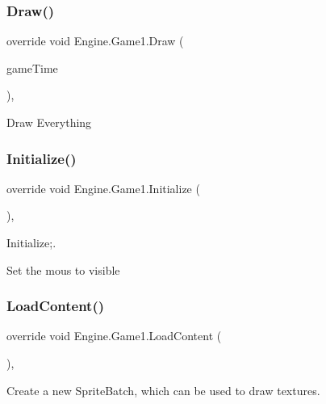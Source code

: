 \subsubsection{\texorpdfstring{Draw()}{Draw()}}
{\footnotesize\ttfamily override void Engine.\+Game1.\+Draw (\begin{DoxyParamCaption}\item[{Game\+Time}]{game\+Time }\end{DoxyParamCaption})\hspace{0.3cm}{\ttfamily [inline]}, {\ttfamily [protected]}}

Draw Everything \mbox{\label{a00306_a640e4df5dfc3ea2b4dab155f3dc3152c}} 
\subsubsection{\texorpdfstring{Initialize()}{Initialize()}}
{\footnotesize\ttfamily override void Engine.\+Game1.\+Initialize (\begin{DoxyParamCaption}{ }\end{DoxyParamCaption})\hspace{0.3cm}{\ttfamily [inline]}, {\ttfamily [protected]}}



Initialize;. 

Set the mous to visible \mbox{\label{a00306_a0c121f8c93986e79a1c402689f53d78e}} 
\subsubsection{\texorpdfstring{Load\+Content()}{LoadContent()}}
{\footnotesize\ttfamily override void Engine.\+Game1.\+Load\+Content (\begin{DoxyParamCaption}{ }\end{DoxyParamCaption})\hspace{0.3cm}{\ttfamily [inline]}, {\ttfamily [protected]}}

Create a new Sprite\+Batch, which can be used to draw textures. \mbox{\label{a00306_a514f0c28029716a22b7e580a06fef9a0}} 
